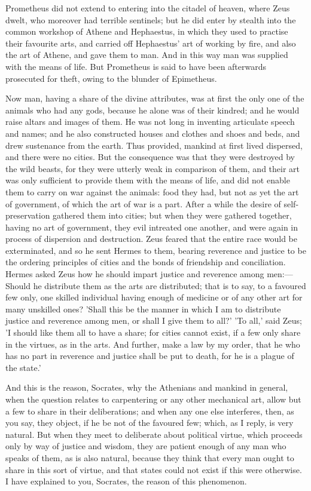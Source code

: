 \documentclass[11pt,letter]{article}
\begin{document}
Prometheus did not extend to entering into the citadel of heaven, where Zeus dwelt, who moreover had terrible sentinels; but he did enter by stealth into the common workshop of Athene and Hephaestus, in which they used to practise their favourite arts, and carried off Hephaestus' art of working by fire, and also the art of Athene, and gave them to man. And in this way man was supplied with the means of life. But Prometheus is said to have been afterwards prosecuted for theft, owing to the blunder of Epimetheus.

\par  Now man, having a share of the divine attributes, was at first the only one of the animals who had any gods, because he alone was of their kindred; and he would raise altars and images of them. He was not long in inventing articulate speech and names; and he also constructed houses and clothes and shoes and beds, and drew sustenance from the earth. Thus provided, mankind at first lived dispersed, and there were no cities. But the consequence was that they were destroyed by the wild beasts, for they were utterly weak in comparison of them, and their art was only sufficient to provide them with the means of life, and did not enable them to carry on war against the animals: food they had, but not as yet the art of government, of which the art of war is a part. After a while the desire of self-preservation gathered them into cities; but when they were gathered together, having no art of government, they evil intreated one another, and were again in process of dispersion and destruction. Zeus feared that the entire race would be exterminated, and so he sent Hermes to them, bearing reverence and justice to be the ordering principles of cities and the bonds of friendship and conciliation. Hermes asked Zeus how he should impart justice and reverence among men:—Should he distribute them as the arts are distributed; that is to say, to a favoured few only, one skilled individual having enough of medicine or of any other art for many unskilled ones? 'Shall this be the manner in which I am to distribute justice and reverence among men, or shall I give them to all?' 'To all,' said Zeus; 'I should like them all to have a share; for cities cannot exist, if a few only share in the virtues, as in the arts. And further, make a law by my order, that he who has no part in reverence and justice shall be put to death, for he is a plague of the state.'

\par  And this is the reason, Socrates, why the Athenians and mankind in general, when the question relates to carpentering or any other mechanical art, allow but a few to share in their deliberations; and when any one else interferes, then, as you say, they object, if he be not of the favoured few; which, as I reply, is very natural. But when they meet to deliberate about political virtue, which proceeds only by way of justice and wisdom, they are patient enough of any man who speaks of them, as is also natural, because they think that every man ought to share in this sort of virtue, and that states could not exist if this were otherwise. I have explained to you, Socrates, the reason of this phenomenon.
\end{document}
